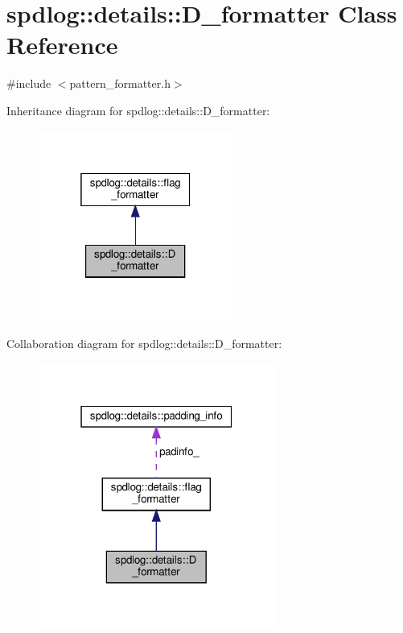 \hypertarget{classspdlog_1_1details_1_1_d__formatter}{}\section{spdlog\+:\+:details\+:\+:D\+\_\+formatter Class Reference}
\label{classspdlog_1_1details_1_1_d__formatter}


{\ttfamily \#include $<$pattern\+\_\+formatter.\+h$>$}



Inheritance diagram for spdlog\+:\+:details\+:\+:D\+\_\+formatter\+:
\nopagebreak
\begin{figure}[H]
\begin{center}
\leavevmode
\includegraphics[width=181pt]{classspdlog_1_1details_1_1_d__formatter__inherit__graph}
\end{center}
\end{figure}


Collaboration diagram for spdlog\+:\+:details\+:\+:D\+\_\+formatter\+:
\nopagebreak
\begin{figure}[H]
\begin{center}
\leavevmode
\includegraphics[width=220pt]{classspdlog_1_1details_1_1_d__formatter__coll__graph}
\end{center}
\end{figure}
